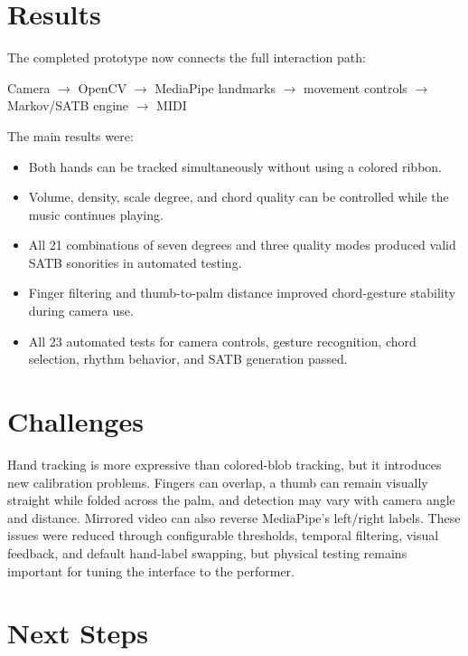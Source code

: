 \documentclass[11pt,a4paper]{article}
\begin{document}
\section{Results}

The completed prototype now connects the full interaction path:

\begin{center}
Camera $\rightarrow$ OpenCV $\rightarrow$ MediaPipe landmarks
$\rightarrow$ movement controls $\rightarrow$ Markov/SATB engine
$\rightarrow$ MIDI
\end{center}

The main results were:

\begin{itemize}
    \item Both hands can be tracked simultaneously without using a colored
    ribbon.
    \item Volume, density, scale degree, and chord quality can be controlled
    while the music continues playing.
    \item All 21 combinations of seven degrees and three quality modes produced
    valid SATB sonorities in automated testing.
    \item Finger filtering and thumb-to-palm distance improved chord-gesture
    stability during camera use.
    \item All 23 automated tests for camera controls, gesture recognition,
    chord selection, rhythm behavior, and SATB generation passed.
\end{itemize}

\section{Challenges}

Hand tracking is more expressive than colored-blob tracking, but it introduces
new calibration problems. Fingers can overlap, a thumb can remain visually
straight while folded across the palm, and detection may vary with camera
angle and distance. Mirrored video can also reverse MediaPipe's left/right
labels. These issues were reduced through configurable thresholds, temporal
filtering, visual feedback, and default hand-label swapping, but physical
testing remains important for tuning the interface to the performer.

\section{Next Steps}
\end{document}

